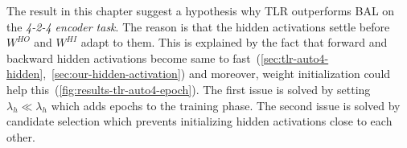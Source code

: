 \label{sec:tlr-auto4-hypothesis} 
The result in this chapter suggest a hypothesis why TLR outperforms BAL on the \emph{4-2-4 encoder task}. The reason is that the hidden activations settle before $W^{HO}$ and $W^{HI}$ adapt to them. This is explained by the fact that forward and backward hidden activations become same to fast~(\ref{sec:tlr-auto4-hidden},~\ref{sec:our-hidden-activation}) and moreover, weight initialization could help this~(\ref{fig:results-tlr-auto4-epoch}). The first issue is solved by setting $\lambda_h \ll \lambda_h$ which adds epochs to the training phase. The second issue is solved by candidate selection which prevents initializing hidden activations close to each other. 

